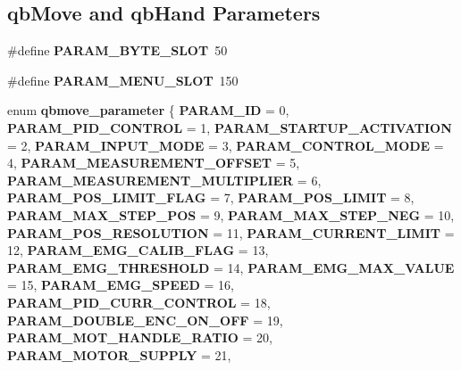 \subsection*{qb\+Move and qb\+Hand Parameters}
\begin{DoxyCompactItemize}
\item 
\mbox{\label{commands_8h_ae3302107827a773be3200e459e7b24da}} 
\#define {\bfseries P\+A\+R\+A\+M\+\_\+\+B\+Y\+T\+E\+\_\+\+S\+L\+OT}~50
\item 
\mbox{\label{commands_8h_a3bab5133f6aa363d84307b39e17b0d74}} 
\#define {\bfseries P\+A\+R\+A\+M\+\_\+\+M\+E\+N\+U\+\_\+\+S\+L\+OT}~150
\item 
enum \textbf{ qbmove\+\_\+parameter} \{ \newline
\textbf{ P\+A\+R\+A\+M\+\_\+\+ID} = 0, 
\textbf{ P\+A\+R\+A\+M\+\_\+\+P\+I\+D\+\_\+\+C\+O\+N\+T\+R\+OL} = 1, 
\textbf{ P\+A\+R\+A\+M\+\_\+\+S\+T\+A\+R\+T\+U\+P\+\_\+\+A\+C\+T\+I\+V\+A\+T\+I\+ON} = 2, 
\textbf{ P\+A\+R\+A\+M\+\_\+\+I\+N\+P\+U\+T\+\_\+\+M\+O\+DE} = 3, 
\newline
\textbf{ P\+A\+R\+A\+M\+\_\+\+C\+O\+N\+T\+R\+O\+L\+\_\+\+M\+O\+DE} = 4, 
\textbf{ P\+A\+R\+A\+M\+\_\+\+M\+E\+A\+S\+U\+R\+E\+M\+E\+N\+T\+\_\+\+O\+F\+F\+S\+ET} = 5, 
\textbf{ P\+A\+R\+A\+M\+\_\+\+M\+E\+A\+S\+U\+R\+E\+M\+E\+N\+T\+\_\+\+M\+U\+L\+T\+I\+P\+L\+I\+ER} = 6, 
\textbf{ P\+A\+R\+A\+M\+\_\+\+P\+O\+S\+\_\+\+L\+I\+M\+I\+T\+\_\+\+F\+L\+AG} = 7, 
\newline
\textbf{ P\+A\+R\+A\+M\+\_\+\+P\+O\+S\+\_\+\+L\+I\+M\+IT} = 8, 
\textbf{ P\+A\+R\+A\+M\+\_\+\+M\+A\+X\+\_\+\+S\+T\+E\+P\+\_\+\+P\+OS} = 9, 
\textbf{ P\+A\+R\+A\+M\+\_\+\+M\+A\+X\+\_\+\+S\+T\+E\+P\+\_\+\+N\+EG} = 10, 
\textbf{ P\+A\+R\+A\+M\+\_\+\+P\+O\+S\+\_\+\+R\+E\+S\+O\+L\+U\+T\+I\+ON} = 11, 
\newline
\textbf{ P\+A\+R\+A\+M\+\_\+\+C\+U\+R\+R\+E\+N\+T\+\_\+\+L\+I\+M\+IT} = 12, 
\textbf{ P\+A\+R\+A\+M\+\_\+\+E\+M\+G\+\_\+\+C\+A\+L\+I\+B\+\_\+\+F\+L\+AG} = 13, 
\textbf{ P\+A\+R\+A\+M\+\_\+\+E\+M\+G\+\_\+\+T\+H\+R\+E\+S\+H\+O\+LD} = 14, 
\textbf{ P\+A\+R\+A\+M\+\_\+\+E\+M\+G\+\_\+\+M\+A\+X\+\_\+\+V\+A\+L\+UE} = 15, 
\newline
\textbf{ P\+A\+R\+A\+M\+\_\+\+E\+M\+G\+\_\+\+S\+P\+E\+ED} = 16, 
\textbf{ P\+A\+R\+A\+M\+\_\+\+P\+I\+D\+\_\+\+C\+U\+R\+R\+\_\+\+C\+O\+N\+T\+R\+OL} = 18, 
\textbf{ P\+A\+R\+A\+M\+\_\+\+D\+O\+U\+B\+L\+E\+\_\+\+E\+N\+C\+\_\+\+O\+N\+\_\+\+O\+FF} = 19, 
\textbf{ P\+A\+R\+A\+M\+\_\+\+M\+O\+T\+\_\+\+H\+A\+N\+D\+L\+E\+\_\+\+R\+A\+T\+IO} = 20, 
\newline
\textbf{ P\+A\+R\+A\+M\+\_\+\+M\+O\+T\+O\+R\+\_\+\+S\+U\+P\+P\+LY} = 21, 

\end{DoxyCompactItemize}
